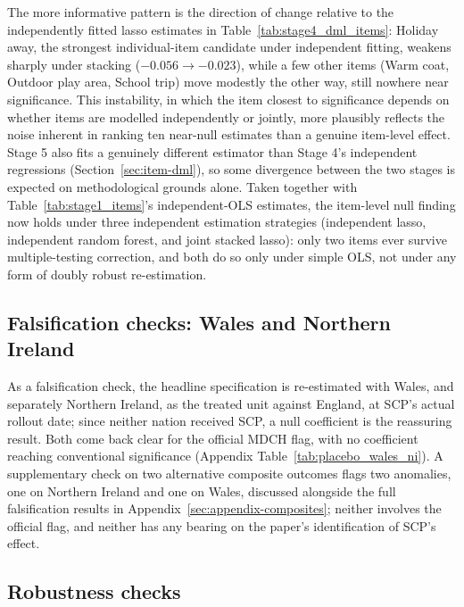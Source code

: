 The more informative pattern is the direction of change relative to the independently fitted lasso estimates in Table~\ref{tab:stage4_dml_items}: Holiday away, the strongest individual-item candidate under independent fitting, weakens sharply under stacking ($-0.056\to-0.023$), while a few other items (Warm coat, Outdoor play area, School trip) move modestly the other way, still nowhere near significance. This instability, in which the item closest to significance depends on whether items are modelled independently or jointly, more plausibly reflects the noise inherent in ranking ten near-null estimates than a genuine item-level effect. Stage 5 also fits a genuinely different estimator than Stage 4's independent regressions (Section~\ref{sec:item-dml}), so some divergence between the two stages is expected on methodological grounds alone. Taken together with Table~\ref{tab:stage1_items}'s independent-OLS estimates, the item-level null finding now holds under three independent estimation strategies (independent lasso, independent random forest, and joint stacked lasso): only two items ever survive multiple-testing correction, and both do so only under simple OLS, not under any form of doubly robust re-estimation.
 
\subsection{Falsification checks: Wales and Northern Ireland}
\label{sec:res-placebo}
 
As a falsification check, the headline specification is re-estimated with Wales, and separately Northern Ireland, as the treated unit against England, at SCP's actual rollout date; since neither nation received SCP, a null coefficient is the reassuring result. Both come back clear for the official MDCH flag, with no coefficient reaching conventional significance (Appendix Table~\ref{tab:placebo_wales_ni}). A supplementary check on two alternative composite outcomes flags two anomalies, one on Northern Ireland and one on Wales, discussed alongside the full falsification results in Appendix~\ref{sec:appendix-composites}; neither involves the official flag, and neither has any bearing on the paper's identification of SCP's effect.
 
\subsection{Robustness checks}
\label{sec:res-robustness}
 

